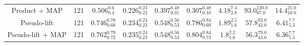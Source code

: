 \begin{tabular}{ccccccccc}
  Product + MAP              & 121                & $0.506^{0.6}_{0.4}$             & $0.226^{0.23}_{0.22}$            & $0.397^{0.48}_{0.31}$             & $0.307^{0.48}_{0.16}$                   & $4.18^{7.4}_{2.8}$            & $93.0^{120.0}_{67.0}$          & $14.4^{21.0}_{10.0}$            \\
  Pseudo-lift                & 121                & $0.746^{0.78}_{0.68}$           & $0.234^{0.24}_{0.23}$            & $0.548^{0.56}_{0.53}$             & $0.786^{0.84}_{0.69}$                   & $1.89^{2.5}_{1.6}$            & $57.8^{82.0}_{42.0}$           & $6.41^{7.7}_{5.3}$              \\
  Pseudo-lift + MAP          & 121                & $0.762^{0.79}_{0.72}$           & $0.235^{0.24}_{0.23}$            & $0.548^{0.56}_{0.53}$             & $0.804^{0.84}_{0.73}$                   & $1.8^{2.2}_{1.6}$             & $56.3^{79.0}_{43.0}$           & $6.36^{7.7}_{5.3}$              \\
  \bottomrule
\end{tabular}
